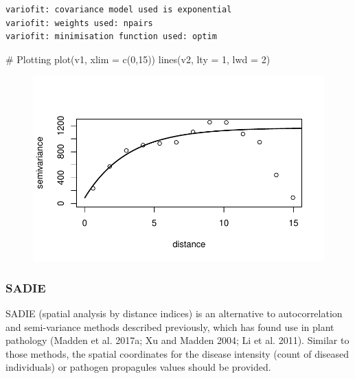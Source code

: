 \documentclass[
  letterpaper,
  DIV=11,
  numbers=noendperiod]{scrreprt}
\newenvironment{Shaded}{\begin{snugshade}}{\end{snugshade}}
\newcommand{\AttributeTok}[1]{\textcolor[rgb]{0.40,0.45,0.13}{#1}}
\newcommand{\CommentTok}[1]{\textcolor[rgb]{0.37,0.37,0.37}{#1}}
\newcommand{\DecValTok}[1]{\textcolor[rgb]{0.68,0.00,0.00}{#1}}
\newcommand{\FunctionTok}[1]{\textcolor[rgb]{0.28,0.35,0.67}{#1}}
\newcommand{\NormalTok}[1]{\textcolor[rgb]{0.00,0.23,0.31}{#1}}
\begin{document}
\begin{verbatim}
variofit: covariance model used is exponential 
variofit: weights used: npairs 
variofit: minimisation function used: optim 
\end{verbatim}

\begin{Shaded}
\begin{Highlighting}[]
\CommentTok{\# Plotting }
\FunctionTok{plot}\NormalTok{(v1, }\AttributeTok{xlim =} \FunctionTok{c}\NormalTok{(}\DecValTok{0}\NormalTok{,}\DecValTok{15}\NormalTok{))}
\FunctionTok{lines}\NormalTok{(v2, }\AttributeTok{lty =} \DecValTok{1}\NormalTok{, }\AttributeTok{lwd =} \DecValTok{2}\NormalTok{)}
\end{Highlighting}
\end{Shaded}

\begin{figure}[H]

{\centering \includegraphics{./spatial-tests_files/figure-pdf/unnamed-chunk-74-1.pdf}

}

\end{figure}

\hypertarget{sadie}{%
\subsubsection{SADIE}\label{sadie}}

SADIE (spatial analysis by distance indices) is an alternative to
autocorrelation and semi-variance methods described previously, which
has found use in plant pathology (Madden et al. 2017a; Xu and Madden
2004; Li et al. 2011). Similar to those methods, the spatial coordinates
for the disease intensity (count of diseased individuals) or pathogen
propagules values should be provided.
\end{document}

